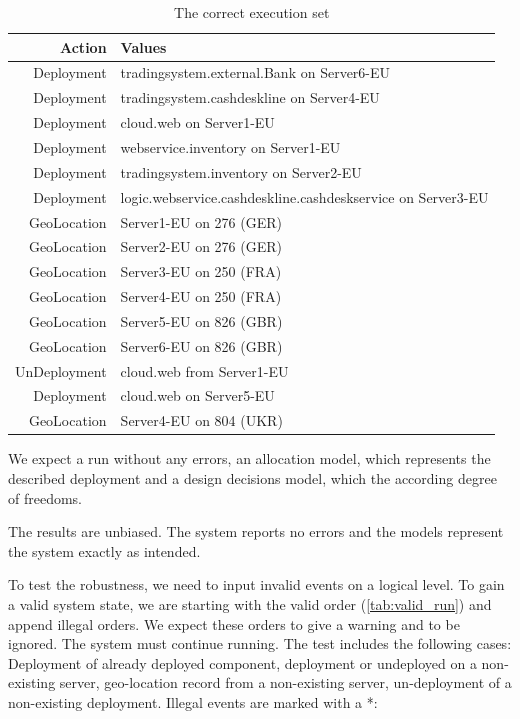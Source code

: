 \begin{table}[h]
	\centering
	\begin{tabular}{r | l}
		\hline
		\textbf{Action} & \textbf{Values}\\
		\hline
		Deployment & tradingsystem.external.Bank on Server6-EU\\
		Deployment & tradingsystem.cashdeskline on Server4-EU\\
		Deployment & cloud.web on Server1-EU\\
		Deployment & webservice.inventory on Server1-EU\\
		Deployment & tradingsystem.inventory on Server2-EU\\
		Deployment & logic.webservice.cashdeskline.cashdeskservice on Server3-EU\\
		GeoLocation & Server1-EU on 276 (GER)\\
		GeoLocation & Server2-EU on 276 (GER)\\
		GeoLocation & Server3-EU on 250 (FRA)\\
		GeoLocation & Server4-EU on 250 (FRA)\\
		GeoLocation & Server5-EU on 826 (GBR)\\
		GeoLocation & Server6-EU on 826 (GBR)\\
		UnDeployment & cloud.web from Server1-EU\\
		Deployment & cloud.web on Server5-EU\\
		GeoLocation & Server4-EU on 804 (UKR)\\
		\hline
		\end{tabular}
	\caption{The correct execution set}
	\label{tab:valid_run}
\end{table}

We expect a run without any errors, an allocation model, which represents the described deployment and a design decisions model, which the according degree of freedoms.

The results are unbiased. The system reports no errors and the models represent the system exactly as intended.

To test the robustness, we need to input invalid events on a logical level. To gain a valid system state, we are starting with the valid order (\autoref{tab:valid_run}) and append illegal orders. We expect these orders to give a warning and to be ignored. The system must continue running. The test includes the following cases: Deployment of already deployed component, deployment or undeployed on a non-existing server, geo-location record from a non-existing server, un-deployment of a non-existing deployment. Illegal events are marked with a *:

